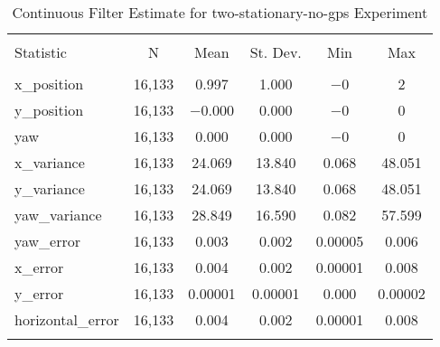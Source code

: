 
\begin{table}[h] \centering 
  \caption{Continuous Filter Estimate for two-stationary-no-gps Experiment} 
  \label{tab:two_stationary_no_gps_continuous_summary} 
\begin{tabular}{@{\extracolsep{5pt}}lccccc} 
\\[-1.8ex]\hline 
\hline \\[-1.8ex] 
Statistic & \multicolumn{1}{c}{N} & \multicolumn{1}{c}{Mean} & \multicolumn{1}{c}{St. Dev.} & \multicolumn{1}{c}{Min} & \multicolumn{1}{c}{Max} \\ 
\hline \\[-1.8ex] 
x\_position & 16,133 & 0.997 & 1.000 & $-$0 & 2 \\ 
y\_position & 16,133 & $-$0.000 & 0.000 & $-$0 & 0 \\ 
yaw & 16,133 & 0.000 & 0.000 & $-$0 & 0 \\ 
x\_variance & 16,133 & 24.069 & 13.840 & 0.068 & 48.051 \\ 
y\_variance & 16,133 & 24.069 & 13.840 & 0.068 & 48.051 \\ 
yaw\_variance & 16,133 & 28.849 & 16.590 & 0.082 & 57.599 \\ 
yaw\_error & 16,133 & 0.003 & 0.002 & 0.00005 & 0.006 \\ 
x\_error & 16,133 & 0.004 & 0.002 & 0.00001 & 0.008 \\ 
y\_error & 16,133 & 0.00001 & 0.00001 & 0.000 & 0.00002 \\ 
horizontal\_error & 16,133 & 0.004 & 0.002 & 0.00001 & 0.008 \\ 
\hline \\[-1.8ex] 
\end{tabular} 
\end{table} 

